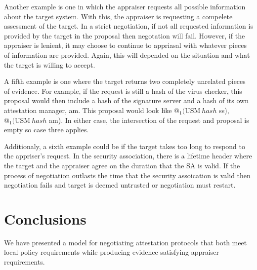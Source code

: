 \documentclass[sigconf,authordraft]{acmart}
\begin{document}
Another example is one in which the appraiser requests all possible information about the target system. With this, the appraiser is requesting a compelete assessment of the target.  In a strict negotiation, if not all requested information is provided by the target in the proposal then negotation will fail. However, if the appraiser is lenient, it may choose to continue to appriasal with whatever pieces of information are provided. Again, this will depended on the situation and what the target is willing to accept.


A fifth example is one where the target returns two completely unrelated pieces of evidence. For example, if the request is still a hash of the virus checker, this proposal would then include a hash of the signature server and a hash of its own attestation manager, am. This proposal would look like {$@_1 (\text{USM}\: hash$ ss), $@_1 (\text{USM}\: hash$ am)}. In either case, the intersection of the request and proposal is empty so case three applies. 

Additionaly, a sixth example could be if the target takes too long to respond to the appriser's request. In the security association, there is a lifetime header where the target and the appraiser agree on the duration that the SA is valid. If the process of negotiation outlasts the time that the security assoication is valid then negotiation fails and target is deemed untrusted or negotiation must restart. 


\section{Conclusions}

We have presented a model for negotiating attestation protocols that
both meet local policy requirements while producing evidence
satisfying appraiser requirements.

\nocite{Coker::Principles-of-R,Ramsdell:2019aa,Petz:2019aa,Davey:02:Introduction-to}

 
\end{document}
